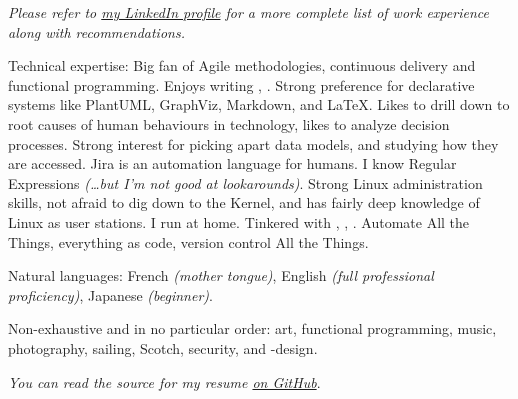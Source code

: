 \documentclass[10pt,letterpaper]{article}
\begin{document}
\begin{center}
  \emph{\small Please refer to \href{https://www.linkedin.com/in/alexis-vanier-94705463/}{my LinkedIn profile} for a more complete list of work experience along with recommendations.}
\end{center}


\spacedhrule{-0.2em}{-0.4em}


\inlineheadsection  %
  {Technical expertise:}
  {Big fan of Agile methodologies, continuous delivery and functional programming. Enjoys writing , . Strong preference for declarative systems like PlantUML, GraphViz, Markdown, and \LaTeX. Likes to drill down to root causes of human behaviours in technology, likes to analyze decision processes. Strong interest for picking apart data models, and studying how they are accessed. Jira is an automation language for humans. I know Regular Expressions \emph{\small{(\ldots but I'm not good at lookarounds)}}. Strong Linux administration skills, not afraid to dig down to the Kernel, and has fairly deep knowledge of Linux as user stations. I run  at home. Tinkered with , , . Automate All the Things, everything as code, version control All the Things.}

\vspace{0.5em}
\inlineheadsection
  {Natural languages:}
  {French \emph{(mother tongue)}, English \emph{(full professional proficiency)}, Japanese \emph{(beginner)}.}


\spacedhrule{1.6em}{-0.4em}


\inlineheadsection
  {Non-exhaustive and in no particular order:}
  {art, functional programming, music, photography, sailing, Scotch, security, and -design.}

\vspace{1em}
\begin{center}
  \emph{\small You can read the source for my resume \href{https://github.com/avanier/latex-resume/blob/master/alexis-vanier-resume.tex}{on GitHub}}.
\end{center}
\end{document}
